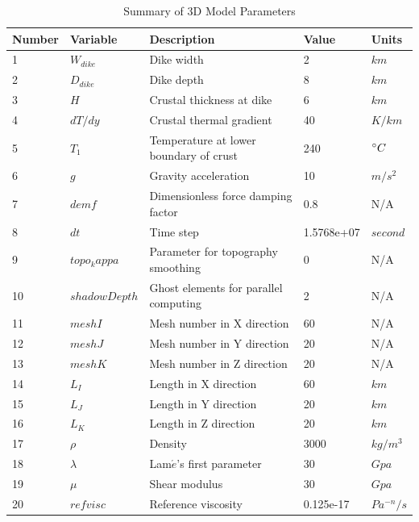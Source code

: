 \begin{table}[h]
\caption{Summary of 3D Model Parameters}
\centering
 \small
  \begin{tabular}[h]{l l p{6.8cm} l l}
\hline
\hline
Number & Variable & Description & Value & Units \\ 
\hline
1    &  $W_{dike}$    &   Dike width        & 2   &  $km$\\
\hline
2    &  $D_{dike}$    &   Dike depth        & 8   &  $km$\\
\hline
3    &  $H$    &   Crustal thickness at dike   & 6   &  $km$ \\
\hline
4    &  $dT/dy$    &   Crustal thermal gradient        & 40   &  $K/km$ \\
\hline
5    &  $T_{1}$    &   Temperature at lower boundary of crust    & 240   &  $\degree C$ \\
\hline
6    &  $g$    &   Gravity acceleration    & 10   &  $m/s^{2}$ \\
\hline
7    &  $demf$    &   Dimensionless force damping factor   & 0.8   &  N/A  \\
\hline
8    &  $dt$    &   Time step    & 1.5768e+07   &  $second$  \\
\hline
9    &  $topo_kappa$    &   Parameter for topography smoothing    & 0   &  N/A   \\
\hline
10   &  $shadowDepth$    &   Ghost elements for parallel computing   & 2   &  N/A   \\
\hline
11   &  $meshI$    &   Mesh number in X direction   & 60   &  N/A   \\
\hline
12   &  $meshJ$    &   Mesh number in Y direction      & 20   & N/A  \\
\hline
13   &  $meshK$    &   Mesh number in Z direction      & 20   & N/A  \\
\hline
14   &  $L_{I}$    &   Length in X direction      & 60   & $km$  \\
\hline
15   &  $L_{J}$    &   Length in Y direction      & 20   & $km$  \\
\hline
16   &  $L_{K}$    &   Length in Z direction      & 20   & $km$  \\
\hline
17   &  $\rho$    &    Density      & 3000   & $kg/m^{3}$  \\
\hline
18   &  $\lambda$    &    Lam$\acute{e}$'s first parameter    & 30   & $Gpa$  \\
\hline
19   &  $\mu$    &    Shear modulus      & 30   & $Gpa$  \\
\hline
20   &  $refvisc$    &    Reference viscosity      & 0.125e-17   & $Pa^{-n}/s$  \\

\end{tabular}
\end{table}
